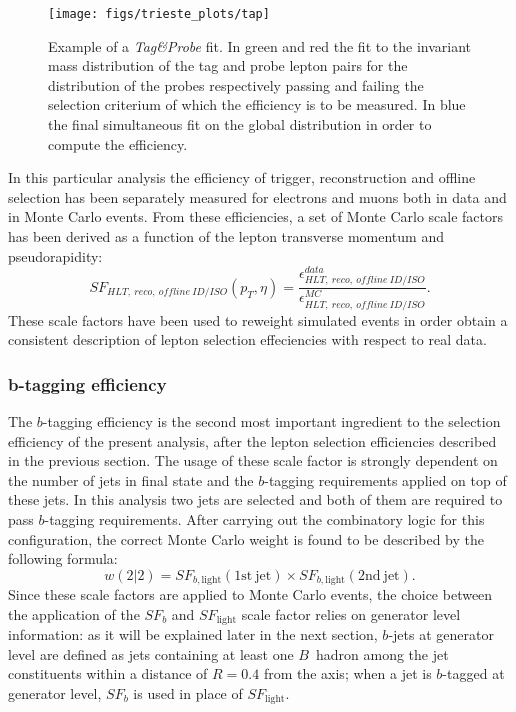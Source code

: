 \begin{figure}[htb]
	\begin{center}
		\leavevmode
		\texttt{[image: figs/trieste\_plots/tap]}
	\end{center}
	\caption{Example of a \textit{Tag\&Probe} fit. In green and red 
          the fit to the invariant mass distribution of the 
          tag and probe lepton pairs for the distribution of the probes 
          respectively passing and failing the selection criterium of 
          which the efficiency is to be measured.
          In blue the final simultaneous fit on the global distribution 
          in order to compute the efficiency.}
	\label{fig:tagandprobefit}
\end{figure}

In this particular analysis the efficiency of trigger, reconstruction and 
offline selection has been separately measured for electrons and muons both 
in data and in Monte Carlo events. From these efficiencies, 
a set of Monte Carlo scale factors has been derived as a function of the 
lepton transverse momentum and pseudorapidity:
$$SF_{HLT,~reco,~offline~ID/ISO} (p_{T},\eta) = \frac{\epsilon_{HLT,~reco,~offline~ID/ISO}^{data}}{\epsilon_{HLT,~reco,~offline~ID/ISO}^{MC}} \mathrm{.}$$
These scale factors have been used to reweight simulated events in order obtain 
a consistent description of lepton selection effeciencies with respect to real data.

\subsubsection{b-tagging efficiency}

The $b$-tagging efficiency is the second most important ingredient to the 
selection efficiency of the present analysis, after the lepton selection 
efficiencies described in the previous section.
The usage of these scale factor is strongly dependent on the number of jets 
in final state and the $b$-tagging requirements applied on top of these jets.
In this analysis two jets are selected and both of them are required to pass 
$b$-tagging requirements. After carrying out the combinatory logic for this 
configuration, the correct Monte Carlo weight is found to be described by the 
following formula:
$$ w(2|2) = SF_{b,\mathrm{light}}(\mathrm{1st~jet}) \times SF_{b,\mathrm{light}}(\mathrm{2nd~jet}) \mathrm{.}$$
Since these scale factors are applied to Monte Carlo events, the choice 
between the application of the $SF_{b}$ and $SF_{\mathrm{light}}$ scale 
factor relies on generator level information: as it will be explained later 
in the next section, $b$-jets at generator level are defined as jets containing
at least one $B$~hadron among the jet constituents within a distance of $R=0.4$ 
from the axis; when a jet is $b$-tagged at generator level, $SF_{b}$ is used 
in place of $SF_{\mathrm{light}}$.

